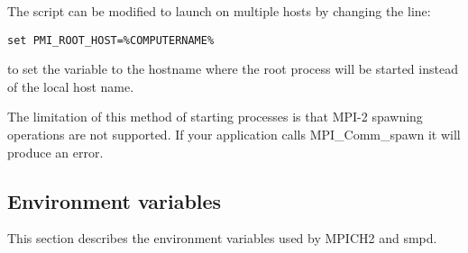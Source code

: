 \documentclass[dvipdfm,11pt]{article}
\begin{document}
The script can be modified to launch on multiple hosts by changing the line:
\begin{verbatim}
set PMI_ROOT_HOST=%COMPUTERNAME%
\end{verbatim}
to set the variable to the hostname where the root process will be started instead
of the local host name.

The limitation of this method of starting processes is that MPI-2 spawning operations
are not supported.  If your application calls MPI\_Comm\_spawn it will produce
an error.

\subsection{Environment variables}
This section describes the environment variables used by MPICH2 and smpd.
\end{document}
